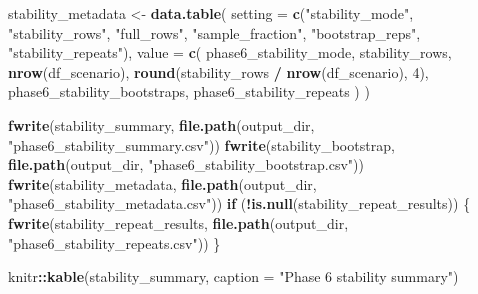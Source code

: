 \documentclass[
]{article}
\newenvironment{Shaded}{\begin{snugshade}}{\end{snugshade}}
\newcommand{\AttributeTok}[1]{\textcolor[rgb]{0.13,0.29,0.53}{#1}}
\newcommand{\ControlFlowTok}[1]{\textcolor[rgb]{0.13,0.29,0.53}{\textbf{#1}}}
\newcommand{\DecValTok}[1]{\textcolor[rgb]{0.00,0.00,0.81}{#1}}
\newcommand{\FunctionTok}[1]{\textcolor[rgb]{0.13,0.29,0.53}{\textbf{#1}}}
\newcommand{\NormalTok}[1]{#1}
\newcommand{\OtherTok}[1]{\textcolor[rgb]{0.56,0.35,0.01}{#1}}
\newcommand{\SpecialCharTok}[1]{\textcolor[rgb]{0.81,0.36,0.00}{\textbf{#1}}}
\newcommand{\StringTok}[1]{\textcolor[rgb]{0.31,0.60,0.02}{#1}}
\begin{document}
\begin{Shaded}
\begin{Highlighting}[]
\NormalTok{stability\_metadata }\OtherTok{\textless{}{-}} \FunctionTok{data.table}\NormalTok{(}
  \AttributeTok{setting =} \FunctionTok{c}\NormalTok{(}\StringTok{"stability\_mode"}\NormalTok{, }\StringTok{"stability\_rows"}\NormalTok{, }\StringTok{"full\_rows"}\NormalTok{, }\StringTok{"sample\_fraction"}\NormalTok{, }\StringTok{"bootstrap\_reps"}\NormalTok{, }\StringTok{"stability\_repeats"}\NormalTok{),}
  \AttributeTok{value =} \FunctionTok{c}\NormalTok{(}
\NormalTok{    phase6\_stability\_mode,}
\NormalTok{    stability\_rows,}
    \FunctionTok{nrow}\NormalTok{(df\_scenario),}
    \FunctionTok{round}\NormalTok{(stability\_rows }\SpecialCharTok{/} \FunctionTok{nrow}\NormalTok{(df\_scenario), }\DecValTok{4}\NormalTok{),}
\NormalTok{    phase6\_stability\_bootstraps,}
\NormalTok{    phase6\_stability\_repeats}
\NormalTok{  )}
\NormalTok{)}

\FunctionTok{fwrite}\NormalTok{(stability\_summary, }\FunctionTok{file.path}\NormalTok{(output\_dir, }\StringTok{"phase6\_stability\_summary.csv"}\NormalTok{))}
\FunctionTok{fwrite}\NormalTok{(stability\_bootstrap, }\FunctionTok{file.path}\NormalTok{(output\_dir, }\StringTok{"phase6\_stability\_bootstrap.csv"}\NormalTok{))}
\FunctionTok{fwrite}\NormalTok{(stability\_metadata, }\FunctionTok{file.path}\NormalTok{(output\_dir, }\StringTok{"phase6\_stability\_metadata.csv"}\NormalTok{))}
\ControlFlowTok{if}\NormalTok{ (}\SpecialCharTok{!}\FunctionTok{is.null}\NormalTok{(stability\_repeat\_results)) \{}
  \FunctionTok{fwrite}\NormalTok{(stability\_repeat\_results, }\FunctionTok{file.path}\NormalTok{(output\_dir, }\StringTok{"phase6\_stability\_repeats.csv"}\NormalTok{))}
\NormalTok{\}}

\NormalTok{knitr}\SpecialCharTok{::}\FunctionTok{kable}\NormalTok{(stability\_summary, }\AttributeTok{caption =} \StringTok{"Phase 6 stability summary"}\NormalTok{)}
\end{Highlighting}
\end{Shaded}
\end{document}
